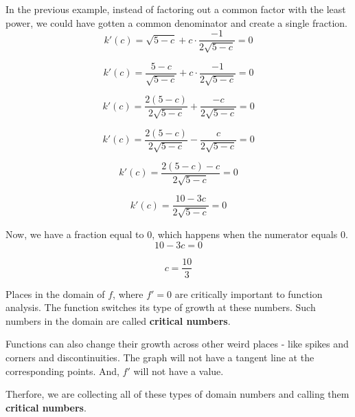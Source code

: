 \documentclass{ximera}
\begin{document}
\begin{explanation}
In the previous example, instead of factoring out a common factor with the least power, we could have gotten a common denominator and create a single fraction.\\



\[   k'(c) = \sqrt{5-c} + c \cdot \frac{-1}{2 \sqrt{5-c}}  = 0  \]


\[   k'(c) = \frac{5-c}{\sqrt{5-c}} + c \cdot \frac{-1}{2 \sqrt{5-c}}  = 0  \]


\[   k'(c) = \frac{2(5-c)}{2 \sqrt{5-c}} +  \frac{-c}{2 \sqrt{5-c}}  = 0  \]


\[   k'(c) = \frac{2(5-c)}{2 \sqrt{5-c}} -  \frac{c}{2 \sqrt{5-c}}  = 0  \]


\[   k'(c) = \frac{2(5-c)-c}{2 \sqrt{5-c}}  = 0  \]

\[   k'(c) = \frac{10 - 3c}{2 \sqrt{5-c}}   = 0  \]



Now, we have a fraction equal to $0$, which happens when the numerator equals $0$. \\

\[  10 - 3c = 0  \]

\[  c = \frac{10}{3}  \]






\end{explanation}








Places in the domain of $f$, where $f' = 0$ are critically important to function analysis. The function switches its type of growth at these numbers.  Such numbers in the domain are called \textbf{\textcolor{purple!85!blue}{critical numbers}}.


Functions can also change their growth across other weird places - like spikes and corners and discontinuities.  The graph will not have a tangent line at the corresponding points. And, $f'$ will not have a value.




Therfore, we are collecting all of these types of domain numbers and calling them \textbf{\textcolor{purple!85!blue}{critical numbers}}.
\end{document}
